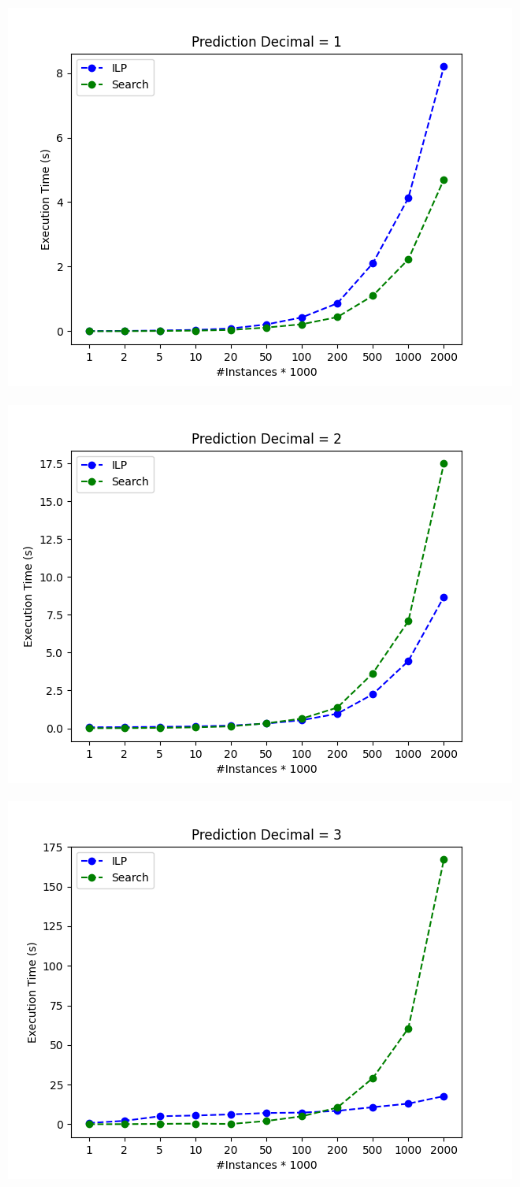 \documentclass[a4paper]{article}
\begin{document}
\pagebreak


\begin{center}
\includegraphics[]{figure_1}
\end{center}

\begin{center}
	\includegraphics[]{figure_2}
\end{center}

\begin{center}
	\includegraphics[]{figure_3}
\end{center}
\end{document}
